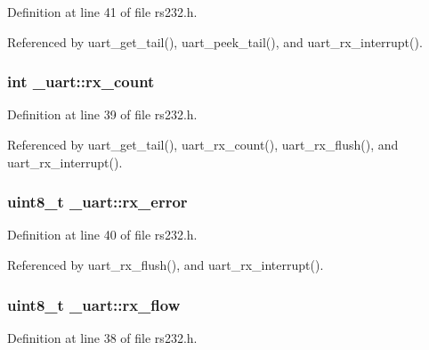 Definition at line 41 of file rs232.\+h.



Referenced by uart\+\_\+get\+\_\+tail(), uart\+\_\+peek\+\_\+tail(), and uart\+\_\+rx\+\_\+interrupt().

\subsubsection[{\texorpdfstring{rx\+\_\+count}{rx_count}}]{\setlength{\rightskip}{0pt plus 5cm}int \+\_\+uart\+::rx\+\_\+count}\hypertarget{struct__uart_a50b344402c339343e3f32c82358e190c}{}\label{struct__uart_a50b344402c339343e3f32c82358e190c}


Definition at line 39 of file rs232.\+h.



Referenced by uart\+\_\+get\+\_\+tail(), uart\+\_\+rx\+\_\+count(), uart\+\_\+rx\+\_\+flush(), and uart\+\_\+rx\+\_\+interrupt().

\subsubsection[{\texorpdfstring{rx\+\_\+error}{rx_error}}]{\setlength{\rightskip}{0pt plus 5cm}uint8\+\_\+t \+\_\+uart\+::rx\+\_\+error}\hypertarget{struct__uart_a6c0b44754c36dd831e1da4f02b124167}{}\label{struct__uart_a6c0b44754c36dd831e1da4f02b124167}


Definition at line 40 of file rs232.\+h.



Referenced by uart\+\_\+rx\+\_\+flush(), and uart\+\_\+rx\+\_\+interrupt().

\subsubsection[{\texorpdfstring{rx\+\_\+flow}{rx_flow}}]{\setlength{\rightskip}{0pt plus 5cm}uint8\+\_\+t \+\_\+uart\+::rx\+\_\+flow}\hypertarget{struct__uart_a193691b69079880daf5b5b9894fb6aa5}{}\label{struct__uart_a193691b69079880daf5b5b9894fb6aa5}


Definition at line 38 of file rs232.\+h.




